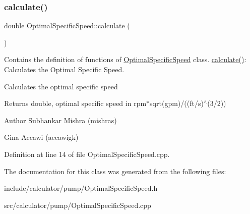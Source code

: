 \subsubsection{\texorpdfstring{calculate()}{calculate()}}
{\footnotesize\ttfamily double Optimal\+Specific\+Speed\+::calculate (\begin{DoxyParamCaption}{ }\end{DoxyParamCaption})}



Contains the definition of functions of \hyperlink{class_optimal_specific_speed}{Optimal\+Specific\+Speed} class. \hyperlink{class_optimal_specific_speed_a75c0c0d37edbff80744f2f6e7fe1f4e1}{calculate()}\+: Calculates the Optimal Specific Speed. 

Calculates the optimal specific speed \begin{DoxyReturn}{Returns}
double, optimal specific speed in rpm$\ast$sqrt(gpm)/((ft/s)$^\wedge$(3/2))
\end{DoxyReturn}
\begin{DoxyAuthor}{Author}
Subhankar Mishra (mishras) 

Gina Accawi (accawigk) 
\end{DoxyAuthor}


Definition at line 14 of file Optimal\+Specific\+Speed.\+cpp.



The documentation for this class was generated from the following files\+:\begin{DoxyCompactItemize}
\item 
include/calculator/pump/Optimal\+Specific\+Speed.\+h\item 
src/calculator/pump/Optimal\+Specific\+Speed.\+cpp\end{DoxyCompactItemize}
